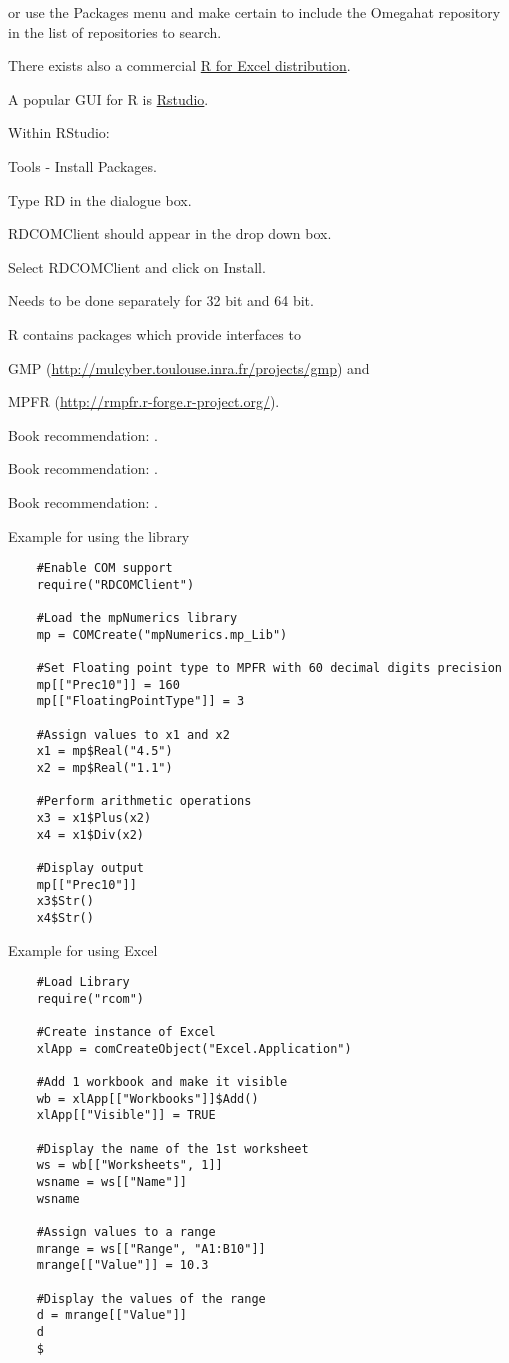 	or use the Packages menu and make certain to include the Omegahat repository in the list of repositories to search. 
	
	There exists also a commercial \href{http://rcom.univie.ac.at/main.html}{R for Excel distribution}.
	
	\vpara
	A popular GUI for R is \href{http://www.rstudio.com/}{Rstudio}.
	
	Within RStudio:
	
	Tools - Install Packages.
	
	Type RD in the dialogue box.
	
	RDCOMClient should appear in the drop down box.
	
	Select RDCOMClient and click on Install.
	
	Needs to be done separately for 32 bit and 64 bit.
	
	\vpara
	R contains packages which provide interfaces to 
	
	GMP (\href{http://mulcyber.toulouse.inra.fr/projects/gmp}{http://mulcyber.toulouse.inra.fr/projects/gmp}) and 
	
	MPFR (\href{http://rmpfr.r-forge.r-project.org/}{http://rmpfr.r-forge.r-project.org/}). 
	
	\vpara
	Book recommendation: \cite{Adler2012}.
	
	Book recommendation: \cite{Verzani2011}.
	
	Book recommendation: \cite{Chang2012}.
	
	\vpara
	Example for using the library
	
	\begin{lstlisting}
	#Enable COM support
	require("RDCOMClient")
	
	#Load the mpNumerics library
	mp = COMCreate("mpNumerics.mp_Lib")
	
	#Set Floating point type to MPFR with 60 decimal digits precision
	mp[["Prec10"]] = 160
	mp[["FloatingPointType"]] = 3
	
	#Assign values to x1 and x2
	x1 = mp$Real("4.5")
	x2 = mp$Real("1.1")
	
	#Perform arithmetic operations
	x3 = x1$Plus(x2)
	x4 = x1$Div(x2)
	
	#Display output
	mp[["Prec10"]]
	x3$Str()
	x4$Str()
	\end{lstlisting}
	
	\vpara
	Example for using Excel
	
	\begin{lstlisting}
	#Load Library
	require("rcom")
	
	#Create instance of Excel
	xlApp = comCreateObject("Excel.Application")
	
	#Add 1 workbook and make it visible
	wb = xlApp[["Workbooks"]]$Add()
	xlApp[["Visible"]] = TRUE
	
	#Display the name of the 1st worksheet
	ws = wb[["Worksheets", 1]]
	wsname = ws[["Name"]]
	wsname
	
	#Assign values to a range
	mrange = ws[["Range", "A1:B10"]]
	mrange[["Value"]] = 10.3
	
	#Display the values of the range
	d = mrange[["Value"]]
	d
	$
	\end{lstlisting}
	
